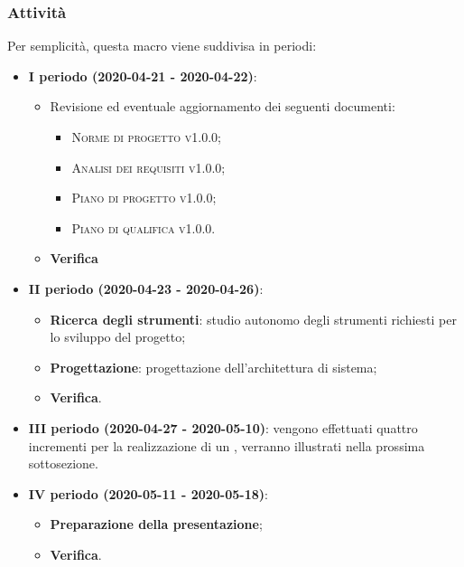 \documentclass[../piano-di-progetto.tex]{subfiles}
\begin{document}
\subsubsection{Attività}   
Per semplicità, questa macro viene suddivisa in periodi:
\begin{itemize}

    \item \textbf{I periodo (2020-04-21 - 2020-04-22)}:
        \begin{itemize}
            \item Revisione ed eventuale aggiornamento dei seguenti documenti:
            \begin{itemize}
                \item \textsc{Norme di progetto v1.0.0};
                \item \textsc{Analisi dei requisiti v1.0.0};
                \item \textsc{Piano di progetto v1.0.0};
                \item \textsc{Piano di qualifica v1.0.0}.
            \end{itemize}

            \item \textbf{Verifica}
        \end{itemize}

    \item \textbf{II periodo (2020-04-23 - 2020-04-26)}:
        \begin{itemize}
            \item \textbf{Ricerca degli strumenti}: studio autonomo degli strumenti richiesti per lo sviluppo del progetto; 
            \item \textbf{Progettazione}: progettazione dell'architettura di sistema;
            \item \textbf{Verifica}.
        \end{itemize}
    \item \textbf{III periodo (2020-04-27 - 2020-05-10)}: vengono effettuati quattro incrementi per la realizzazione di un , verranno illustrati nella prossima sottosezione.
    \item \textbf{IV periodo (2020-05-11 - 2020-05-18)}: 
            \begin{itemize}
                \item \textbf{Preparazione della presentazione};
                \item \textbf{Verifica}.
            \end{itemize}
        \end{itemize}
\end{document}
